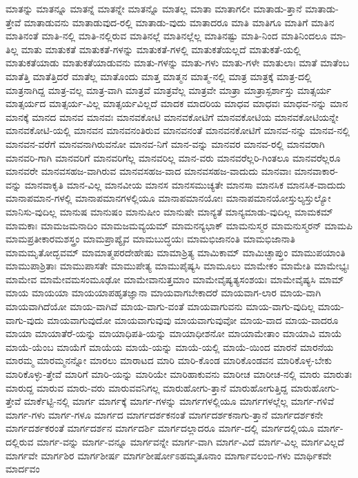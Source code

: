 {ಮಾತನ್ನು
ಮಾತನ್ನೂ
ಮಾತನ್ನೆ
ಮಾತನ್ನೇ
ಮಾತನ್ನೊ
ಮಾತಲ್ಲ
ಮಾತಾ
ಮಾತಾಗಲೀ
ಮಾತಾಡು-ತ್ತಾನೆ
ಮಾತಾಡು-ತ್ತೇವೆ
ಮಾತಾಡುವನು
ಮಾತಾಡುವುದ-ರಲ್ಲಿ
ಮಾತಾಡು-ವುದು
ಮಾತಾದರೂ
ಮಾತಿ
ಮಾತಿಗೂ
ಮಾತಿಗೆ
ಮಾತಿನ
ಮಾತಿನಂತೆ
ಮಾತಿ-ನಲ್ಲಿ
ಮಾತಿ-ನಲ್ಲಿರುವ
ಮಾತಿನಲ್ಲೆ
ಮಾತಿನಲ್ಲೆಲ್ಲ
ಮಾತಿನಷ್ಟು
ಮಾತಿ-ನಿಂದ
ಮಾತಿನಿಂದಲೂ
ಮಾ-ತಿಲ್ಲ
ಮಾತು
ಮಾತುಕತೆ
ಮಾತುಕತೆ-ಗಳನ್ನು
ಮಾತುಕತೆ-ಗಳಲ್ಲಿ
ಮಾತುಕತೆಯಲ್ಲದೆ
ಮಾತುಕತೆ-ಯಲ್ಲಿ
ಮಾತುಕತೆಯಾಡು
ಮಾತುಕತೆಯಾಡುವನು
ಮಾತು-ಗಳನ್ನು
ಮಾತು-ಗಳು
ಮಾತು-ಗಳೇ
ಮಾತುಲಾಃ
ಮಾತೆ
ಮಾತೆಂಬ
ಮಾತೆತ್ತಿ
ಮಾತೆತ್ತಿದರೆ
ಮಾತೆಲ್ಲ
ಮಾತೊಂದು
ಮಾತ್ತ
ಮಾತ್ಮನ
ಮಾತ್ಮ-ನಲ್ಲಿ
ಮಾತ್ರ
ಮಾತ್ರಕ್ಕೆ
ಮಾತ್ರ-ದಲ್ಲಿ
ಮಾತ್ರನಾಗಿದ್ದ
ಮಾತ್ರ-ವಲ್ಲ
ಮಾತ್ರ-ವಾಗಿ
ಮಾತ್ರವೆ
ಮಾತ್ರವೆಲ್ಲ
ಮಾತ್ರವೇ
ಮಾತ್ರಾ
ಮಾತ್ರಾಸ್ಪರ್ಶಾಸ್ತು
ಮಾತ್ಸರ್ಯ
ಮಾತ್ಸರ್ಯದ
ಮಾತ್ಸರ್ಯ-ವಿಲ್ಲ
ಮಾತ್ಸರ್ಯವಿಲ್ಲದೆ
ಮಾದಕ
ಮಾದರಿಯ
ಮಾಧವ
ಮಾಧವಃ
ಮಾಧವ-ನನ್ನು
ಮಾನ
ಮಾನಕ್ಕೆ
ಮಾನದ
ಮಾನವ
ಮಾನವಃ
ಮಾನವಕೋಟಿ
ಮಾನವಕೋಟಿಗೆ
ಮಾನವಕೋಟಿಯ
ಮಾನವಕೋಟಿಯನ್ನೇ
ಮಾನವಕೋಟಿ-ಯಲ್ಲಿ
ಮಾನವನ
ಮಾನವನಂತಿರುವ
ಮಾನವನಂತೆ
ಮಾನವನಕೋಟಿಗೆ
ಮಾನವ-ನನ್ನು
ಮಾನವ-ನಲ್ಲಿ
ಮಾನವನ-ವರೆಗೆ
ಮಾನವನಾಗಿರುವನೋ
ಮಾನವ-ನಿಗೆ
ಮಾನ-ವನ್ನು
ಮಾನವರ
ಮಾನವ-ರಲ್ಲಿ
ಮಾನವರಾಗಿ
ಮಾನವರಿ-ಗಾಗಿ
ಮಾನವರಿಗೆ
ಮಾನವರಿಗೆಲ್ಲ
ಮಾನವರಿಲ್ಲ
ಮಾನ-ವರು
ಮಾನವರೆಲ್ಲರಿ-ಗಿಂತಲೂ
ಮಾನವರೆಲ್ಲರೂ
ಮಾನವರೇ
ಮಾನವಸಹಜ-ವಾಗಿರುವ
ಮಾನವಸಹಜ-ವಾದ
ಮಾನವಸಹಜ-ವಾದುದು
ಮಾನವಾಃ
ಮಾನವಾಕಾರ-ವನ್ನು
ಮಾನವಾಕೃತಿ
ಮಾನ-ವಿಲ್ಲ
ಮಾನವೀಯ
ಮಾನಸ
ಮಾನಸಮುಚ್ಯತೇ
ಮಾನಸಾ
ಮಾನಸಿಕ
ಮಾನಸಿಕ-ವಾದುದು
ಮಾನಾಪಮಾನ-ಗಳಲ್ಲಿ
ಮಾನಾಪಮಾನಗಳಲ್ಲಿಯೂ
ಮಾನಾಪಮಾನಯೋಃ
ಮಾನಾಪಮಾನಯೋಸ್ತುಲ್ಯಸ್ತುಲ್ಯೋ
ಮಾನಿಸು-ವುದಿಲ್ಲ
ಮಾನುಷ
ಮಾನುಷಂ
ಮಾನುಷೀಂ
ಮಾನುಷೇ
ಮಾನ್ಯತೆ
ಮಾನ್ಯಮಾಡು-ವುದಿಲ್ಲ
ಮಾಮಕಮ್
ಮಾಮಕಾಃ
ಮಾಮಜಮನಾದಿಂ
ಮಾಮಜಮವ್ಯಯಮ್
ಮಾಮನನ್ಯಭಾಕ್
ಮಾಮನುಸ್ಮರ
ಮಾಮನುಸ್ಮರನ್
ಮಾಮಪಿ
ಮಾಮಪ್ರತೀಕಾರಮಶಸ್ತ್ರಂ
ಮಾಮಪ್ರಾಪ್ಯೈವ
ಮಾಮಬುದ್ಧಯಃ
ಮಾಮಭಿಜಾನಂತಿ
ಮಾಮಭಿಜಾನಾತಿ
ಮಾಮಮೃತೋದ್ಭವಮ್
ಮಾಮಾತ್ಮಪರದೇಹೇಷು
ಮಾಮಾಶ್ರಿತ್ಯ
ಮಾಮಿಕಾಮ್
ಮಾಮಿಚ್ಛಾಪ್ತುಂ
ಮಾಮುಪಯಾಂತಿ
ಮಾಮುಪಾಶ್ರಿತಾಃ
ಮಾಮುಪಾಸತೇ
ಮಾಮುಪೇತ್ಯ
ಮಾಮುಪೈಷ್ಯಸಿ
ಮಾಮೂಲು
ಮಾಮೇಕಂ
ಮಾಮೇತಿ
ಮಾಮೇಭ್ಯಃ
ಮಾಮೇವ
ಮಾಮೇವಮಸಂಮೂಢೋ
ಮಾಮೇವಾನುತ್ತಮಾಂ
ಮಾಮೇವೈಷ್ಯತ್ಯಸಂಶಯಃ
ಮಾಮೇವೈಷ್ಯಸಿ
ಮಾಮ್
ಮಾಯ
ಮಾಯಯಾ
ಮಾಯಯಾಪಹೃತಜ್ಞಾನಾ
ಮಾಯವಾಗಬೇಕಾದರೆ
ಮಾಯವಾಗ-ಲಾರ
ಮಾಯ-ವಾಗಿ
ಮಾಯವಾಗಿದೆಯೋ
ಮಾಯ-ವಾಗಿವೆ
ಮಾಯ-ವಾಗು-ವಂತೆ
ಮಾಯವಾಗುವನು
ಮಾಯ-ವಾಗು-ವುದಿಲ್ಲ
ಮಾಯ-ವಾಗು-ವುದು
ಮಾಯವಾಗುವುದೋ
ಮಾಯವಾಗುವುವು
ಮಾಯವಾಗುವುವೋ
ಮಾಯ-ವಾದ
ಮಾಯ-ವಾದರೂ
ಮಾಯಾ
ಮಾಯಾತೆರೆ-ಯನ್ನು
ಮಾಯಾಧಿಪತಿ-ಯನ್ನು
ಮಾಯಾಧೀಶನೋ
ಮಾಯಾಮೇತಾಂ
ಮಾಯಾವಿ
ಮಾಯೆ
ಮಾಯೆ-ಯೆಂಬ
ಮಾಯೆಗೆ
ಮಾಯೆಯ
ಮಾಯೆ-ಯನ್ನು
ಮಾಯೆ-ಯಲ್ಲಿ
ಮಾಯೆ-ಯಿಂದ
ಮಾರನೆ
ಮಾರನೆಯ
ಮಾರಮ್ಮ
ಮಾರಮ್ಮನನ್ನೋ
ಮಾರಲು
ಮಾರಾಟದ
ಮಾರಿ
ಮಾರಿ-ಕೊಂಡ
ಮಾರಿಕೊಂಡವನ
ಮಾರಿಕೊಳ್ಳ-ಬೇಕು
ಮಾರಿಕೊಳ್ಳು-ತ್ತೇವೆ
ಮಾರಿಗೆ
ಮಾರಿ-ಯನ್ನು
ಮಾರಿಯೇ
ಮಾರಿಹಾಕುವನು
ಮಾರೀಚ
ಮಾರೀಚ-ನಲ್ಲಿ
ಮಾರು
ಮಾರುತಃ
ಮಾರುದ್ದ
ಮಾರುವ
ಮಾರು-ವರು
ಮಾರುವವನಿಗಲ್ಲ
ಮಾರುಹೋಗು-ತ್ತಾನೆ
ಮಾರುಹೋಗುತ್ತಿದ್ದ
ಮಾರುಹೋಗು-ತ್ತೇವೆ
ಮಾರ್ಕೆಟ್ಟಿ-ನಲ್ಲಿ
ಮಾರ್ಗ
ಮಾರ್ಗಕ್ಕೆ
ಮಾರ್ಗ-ಗಳನ್ನು
ಮಾರ್ಗಗಳಲ್ಲಿಯೂ
ಮಾರ್ಗಗಳಲ್ಲೆಲ್ಲ
ಮಾರ್ಗ-ಗಳಿವೆ
ಮಾರ್ಗ-ಗಳು
ಮಾರ್ಗ-ಗಳೂ
ಮಾರ್ಗದ
ಮಾರ್ಗದರ್ಶಕನಂತೆ
ಮಾರ್ಗದರ್ಶಕನಾಗು-ತ್ತಾನೆ
ಮಾರ್ಗದರ್ಶಕನೇ
ಮಾರ್ಗದರ್ಶಕರಂತೆ
ಮಾರ್ಗದರ್ಶನ
ಮಾರ್ಗದರ್ಶಿ
ಮಾರ್ಗದಲ್ಲಾದರೂ
ಮಾರ್ಗ-ದಲ್ಲಿ
ಮಾರ್ಗದಲ್ಲಿಯೂ
ಮಾರ್ಗ-ದಲ್ಲಿರುವ
ಮಾರ್ಗ-ವನ್ನು
ಮಾರ್ಗ-ವನ್ನೂ
ಮಾರ್ಗವನ್ನೇ
ಮಾರ್ಗ-ವಾಗಿ
ಮಾರ್ಗ-ವಿದೆ
ಮಾರ್ಗ-ವಿಲ್ಲ
ಮಾರ್ಗವಿಲ್ಲದೆ
ಮಾರ್ಗವೇ
ಮಾರ್ಗಶಿರ
ಮಾರ್ಗಶೀರ್ಷ
ಮಾರ್ಗಶೀರ್ಷೋಽಹಮೃತೂನಾಂ
ಮಾರ್ಗಾವಲಂಬಿ-ಗಳು
ಮಾರ್ಥಿಕವೇ
ಮಾರ್ದವಂ
}
